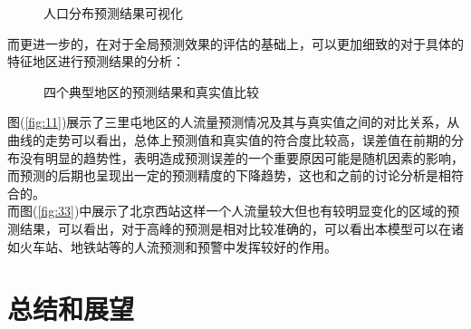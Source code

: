 \begin{figure}[ht]
\centering
{}
\hfill
\caption{人口分布预测结果可视化}
\label{fig:peopleheatmap}
\end{figure}
而更进一步的，在对于全局预测效果的评估的基础上，可以更加细致的对于具体的特征地区进行预测结果的分析：
\begin{figure}[ht]
\centering
{}
\hfill
{}
\caption{四个典型地区的预测结果和真实值比较}
\label{fig:region}
\end{figure}
图(\ref{fig:11})展示了三里屯地区的人流量预测情况及其与真实值之间的对比关系，从曲线的走势可以看出，总体上预测值和真实值的符合度比较高，误差值在前期的分布没有明显的趋势性，表明造成预测误差的一个重要原因可能是随机因素的影响，而预测的后期也呈现出一定的预测精度的下降趋势，这也和之前的讨论分析是相符合的。\\
而图(\ref{fig:33})中展示了北京西站这样一个人流量较大但也有较明显变化的区域的预测结果，可以看出，对于高峰的预测是相对比较准确的，可以看出本模型可以在诸如火车站、地铁站等的人流预测和预警中发挥较好的作用。

\section{总结和展望}